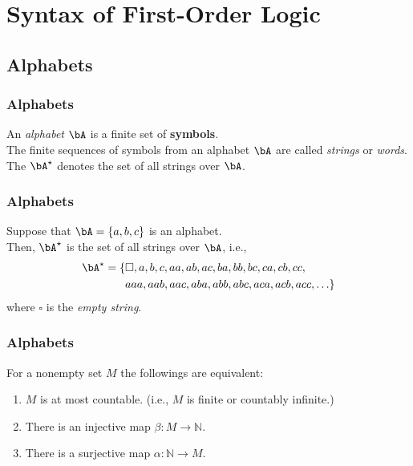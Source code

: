 \section{Syntax of First-Order Logic}

\subsection{Alphabets}

\begin{frame}
    \frametitle{Alphabets}
    \begin{definition}
        An \textit{alphabet} $\bA$ is a finite set of \textbf{symbols}. \\
        \bigskip
        \pause
        The finite sequences of symbols from an alphabet $\bA$ are called \textit{strings} or \textit{words}.
        The $\bA^{\star}$ denotes the set of all strings over $\bA$.
    \end{definition}
\end{frame}

\begin{frame}
    \frametitle{Alphabets}
    \begin{Example}
        Suppose that $\bA = \{ a, b, c \}$ is an alphabet. \\
        \bigskip
        \pause
        Then, $\bA^{\star}$ is the set of all strings over $\bA$, i.e.,
        \begin{align*}
            \bA^{\star} = \{ & \square, a, b, c, aa, ab, ac, ba, bb, bc, ca, cb, cc, \\
                             & aaa, aab, aac, aba, abb, abc, aca, acb, acc, \ldots \}
        \end{align*}
        where $\square$ is the \textit{empty string}.
    \end{Example}
\end{frame}

\begin{frame}
    \frametitle{Alphabets}
    \begin{lemma}
        For a nonempty set $M$ the followings are equivalent:
        \begin{enumerate}
            \item $M$ is at most countable. (i.e., $M$ is finite or countably infinite.)
            \item There is an injective map $\beta : M \rightarrow \mathbb{N}$.
            \item There is a surjective map $\alpha : \mathbb{N} \rightarrow M$.
        \end{enumerate}
    \end{lemma}
\end{frame}

